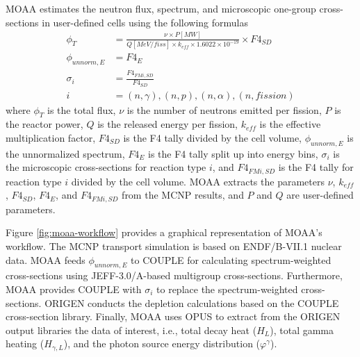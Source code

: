 MOAA estimates the neutron flux, spectrum, and microscopic one-group cross-sections in user-defined cells using the following formulas
\begin{align}
\phi_T &= \frac{\nu \times P [MW]}{Q [MeV/fiss] \times k_{eff} \times 1.6022 \times 10^{-19}} \times F4_{SD} \\
\phi_{unnorm, E} &= F4_E \\
\sigma_i &= \frac{ F4_{FMi, SD} }{ F4_{SD} } \\  %
i &= (n,\gamma), (n,p), (n,\alpha), (n,fission)
\end{align}
where $\phi_T$ is the total flux, $\nu$ is the number of neutrons emitted per fission, $P$ is the reactor power, $Q$ is the released energy per fission, $k_{eff}$ is the effective multiplication factor, $F4_{SD}$ is the F4 tally divided by the cell volume, $\phi_{unnorm, E}$ is the unnormalized spectrum, $F4_E$ is the F4 tally split up into energy bins, $\sigma_i$ is the microscopic cross-sections for reaction type $i$, and $F4_{FMi, SD}$ is the F4 tally for reaction type $i$ divided by the cell volume.
MOAA extracts the parameters $\nu$, $k_{eff}$, $F4_{SD}$, $F4_E$, and $F4_{FMi, SD}$ from the MCNP results, and $P$ and $Q$ are user-defined parameters.

Figure \ref{fig:moaa-workflow} provides a graphical representation of MOAA's workflow.
The MCNP transport simulation is based on ENDF/B-VII.1 nuclear data.
MOAA feeds $\phi_{unnorm, E}$ to COUPLE for calculating spectrum-weighted cross-sections using JEFF-3.0/A-based multigroup cross-sections.
Furthermore, MOAA provides COUPLE with $\sigma_i$ to replace the spectrum-weighted cross-sections.
ORIGEN conducts the depletion calculations based on the COUPLE cross-section library.
Finally, MOAA uses OPUS to extract from the ORIGEN output libraries the data of interest, i.e., total decay heat ($H_L$), total gamma heating ($H_{\gamma,L}$), and the photon source energy distribution ($\varphi^{\gamma}$).




